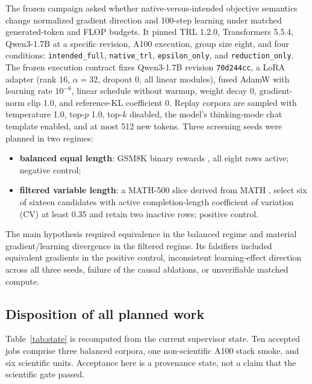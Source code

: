 \documentclass{article}
\begin{document}
The frozen campaign asked whether native-versus-intended objective semantics
change normalized gradient direction and 100-step learning under matched
generated-token and FLOP budgets.  It pinned TRL 1.2.0, Transformers 5.5.4,
Qwen3-1.7B at a specific revision, A100 execution, group size eight, and four
conditions: \texttt{intended\_full}, \texttt{native\_trl},
\texttt{epsilon\_only}, and \texttt{reduction\_only}.  The frozen execution
contract fixes Qwen3-1.7B revision \texttt{70d244cc}, a LoRA adapter (rank 16,
$\alpha=32$, dropout 0, all linear modules), fused AdamW with learning rate
$10^{-6}$, linear schedule without warmup, weight decay 0, gradient-norm clip
1.0, and reference-KL coefficient 0.  Replay corpora are sampled with
temperature 1.0, top-$p$ 1.0, top-$k$ disabled, the model's thinking-mode chat
template enabled, and at most 512 new tokens.  Three screening seeds
were planned in two regimes:

\begin{itemize}[leftmargin=*,itemsep=2pt]
  \item \textbf{balanced equal length}: GSM8K binary rewards
  \citep{cobbe2021gsm8k}, all eight rows active; negative control;
  \item \textbf{filtered variable length}: a MATH-500 slice derived from MATH
  \citep{hendrycks2021math}, select six of sixteen candidates with active
  completion-length coefficient of variation (CV) at least 0.35 and retain two
  inactive rows; positive control.
\end{itemize}

The main hypothesis required equivalence in the balanced regime and material
gradient/learning divergence in the filtered regime.  Its falsifiers included
equivalent gradients in the positive control, inconsistent learning-effect
direction across all three seeds, failure of the causal ablations, or
unverifiable matched compute.

\subsection{Disposition of all planned work}

Table~\ref{tab:state} is recomputed from the current supervisor state.  Ten
accepted jobs comprise three balanced corpora, one non-scientific A100 stack
smoke, and six scientific units.  Acceptance here is a provenance state, not a
claim that the scientific gate passed.
\end{document}
